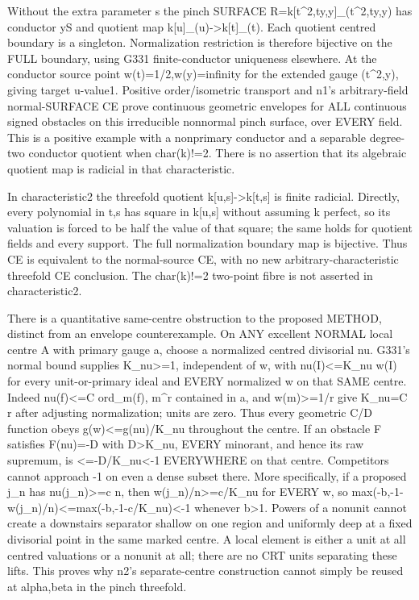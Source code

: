 Without the extra parameter s the pinch SURFACE R=k[t\textasciicircum{}2,ty,y]\_(t\textasciicircum{}2,ty,y) has conductor yS and quotient map k[u]\_(u)-\textgreater{}k[t]\_(t). Each quotient centred boundary is a singleton. Normalization restriction is therefore bijective on the FULL boundary, using G331 finite-conductor uniqueness elsewhere. At the conductor source point w(t)=1/2,w(y)=infinity for the extended gauge (t\textasciicircum{}2,y), giving target u-value1. Positive order/isometric transport and n1's arbitrary-field normal-SURFACE CE prove continuous geometric envelopes for ALL continuous signed obstacles on this irreducible nonnormal pinch surface, over EVERY field. This is a positive example with a nonprimary conductor and a separable degree-two conductor quotient when char(k)!=2. There is no assertion that its algebraic quotient map is radicial in that characteristic.

In characteristic2 the threefold quotient k[u,s]-\textgreater{}k[t,s] is finite radicial. Directly, every polynomial in t,s has square in k[u,s] without assuming k perfect, so its valuation is forced to be half the value of that square; the same holds for quotient fields and every support. The full normalization boundary map is bijective. Thus CE is equivalent to the normal-source CE, with no new arbitrary-characteristic threefold CE conclusion. The char(k)!=2 two-point fibre is not asserted in characteristic2.

There is a quantitative same-centre obstruction to the proposed METHOD, distinct from an envelope counterexample. On ANY excellent NORMAL local centre A with primary gauge a, choose a normalized centred divisorial nu. G331's normal bound supplies K\_nu\textgreater{}=1, independent of w, with nu(I)\textless{}=K\_nu w(I) for every unit-or-primary ideal and EVERY normalized w on that SAME centre. Indeed nu(f)\textless{}=C ord\_m(f), m\textasciicircum{}r contained in a, and w(m)\textgreater{}=1/r give K\_nu=C r after adjusting normalization; units are zero. Thus every geometric C/D function obeys g(w)\textless{}=g(nu)/K\_nu throughout the centre. If an obstacle F satisfies F(nu)=-D with D\textgreater{}K\_nu, EVERY minorant, and hence its raw supremum, is \textless{}=-D/K\_nu\textless{}-1 EVERYWHERE on that centre. Competitors cannot approach -1 on even a dense subset there. More specifically, if a proposed j\_n has nu(j\_n)\textgreater{}=c n, then w(j\_n)/n\textgreater{}=c/K\_nu for EVERY w, so max(-b,-1-w(j\_n)/n)\textless{}=max(-b,-1-c/K\_nu)\textless{}-1 whenever b\textgreater{}1. Powers of a nonunit cannot create a downstairs separator shallow on one region and uniformly deep at a fixed divisorial point in the same marked centre. A local element is either a unit at all centred valuations or a nonunit at all; there are no CRT units separating these lifts. This proves why n2's separate-centre construction cannot simply be reused at alpha,beta in the pinch threefold.

